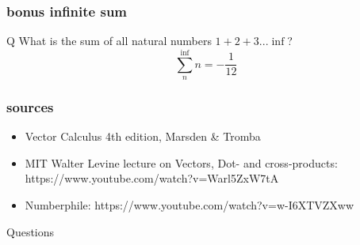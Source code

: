 \documentclass{beamer}
\begin{document}
\begin{frame}
\frametitle{bonus infinite sum}
\begin{block}{Q}
What is the sum of all natural numbers $1+2+3 ... \inf$?
$$\sum_n^{\inf}n = - \frac{1}{12}$$
\end{block}
\end{frame}


\begin{frame}
\frametitle{sources}
\begin{itemize}
\item Vector Calculus 4th edition, Marsden & Tromba
\item MIT Walter Levine lecture on Vectors, Dot- and cross-products: https://www.youtube.com/watch?v=Warl5ZxW7tA
\item Numberphile: https://www.youtube.com/watch?v=w-I6XTVZXww
\end{itemize}
\end{frame}

\begin{frame}
\Huge{\centerline{Questions}}
\end{frame}

\end{document}

